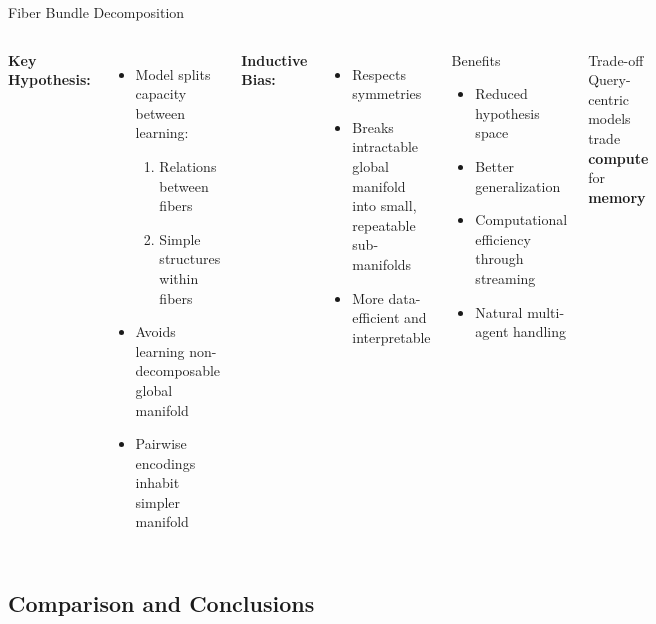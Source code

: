 \documentclass[10pt,aspectratio=169]{beamer}
\begin{document}
\begin{frame}{Fiber Bundle Decomposition}
\begin{columns}[T]
\textbf{Key Hypothesis:}
\begin{itemize}
    \item Model splits capacity between learning:
    \begin{enumerate}
        \item Relations between fibers
        \item Simple structures within fibers
    \end{enumerate}
    \item Avoids learning non-decomposable global manifold
    \item Pairwise encodings inhabit simpler manifold
\end{itemize}

\textbf{Inductive Bias:}
\begin{itemize}
    \item Respects symmetries
    \item Breaks intractable global manifold into small, repeatable sub-manifolds
    \item More data-efficient and interpretable
\end{itemize}

\begin{block}{Benefits}
\begin{itemize}
    \item Reduced hypothesis space
    \item Better generalization
    \item Computational efficiency through streaming
    \item Natural multi-agent handling
\end{itemize}
\end{block}

\begin{alertblock}{Trade-off}
Query-centric models trade \textbf{compute} for \textbf{memory}
\end{alertblock}
\end{columns}
\end{frame}

\subsection{Comparison and Conclusions}
\end{document}
